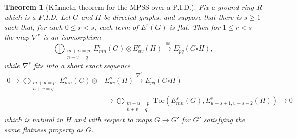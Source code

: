 \documentclass[a4paper, 11 pt, oneside, reqno]{amsart}
\numberwithin{lemma}{section}
\newtheorem{theorem}[lemma]{Theorem}
\theoremstyle{definition}
\newcommand{\xto}{\xrightarrow}
\newcommand{\MPSS}{E}
\begin{document}
\begin{theorem}[K\"unneth theorem for the MPSS over a P.I.D.]
\label{thm:kunneth_box_SS}
    Fix a ground ring \(R\) which is a P.I.D. 
    Let $G$ and $H$ be directed graphs, and suppose that there is $s\geq 1$ such that,
    for each \(0 \leq r < s\), 
    each term of \(\MPSS^r(G)\) is flat. Then for \(1 \leq r < s\) the map \(\nabla^r\) is an isomorphism
    \[
        \bigoplus_{\substack{m+u=p \\ n+v = q}} 
        \MPSS^{r}_{mn}(G) \otimes \MPSS^{r}_{uv}(H) 
        \xto{\ \cong\ } 
        \MPSS^r_{pq}(G \square H),
    \]
    while \(\nabla^{s}\) fits into a short exact sequence
    \begin{align*}
    0 \to \bigoplus_{\substack{m+u=p \\ n+v = q}} \MPSS^{s}_{mn}(G) \otimes & \MPSS^{s}_{uv}(H) \xto{\nabla^{s}} \MPSS^{s}_{pq}(G \square H) \\
    &\to \bigoplus_{\substack{m+u=p \\ n+v = q}} \mathrm{Tor}(\MPSS^{s}_{{mn}}(G),\MPSS^{s}_{{u-s+1,v+s-2}}(H)) \to 0
    \end{align*}
    which is natural in \(H\) and with respect to maps \(G \to G'\) for $G'$ satisfying the same flatness property as \(G\).
\end{theorem}
\end{document}

